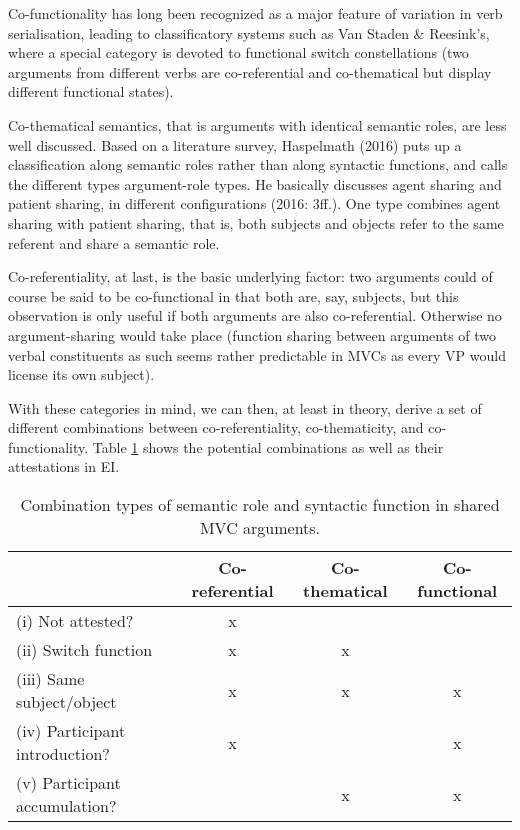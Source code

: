 Co-functionality has long been recognized as a major feature of variation in verb serialisation, leading to classificatory systems such as Van Staden \& Reesink's, where a special category is devoted to functional switch constellations (two arguments from different verbs are co-referential and co-thematical but display different functional states). 

Co-thematical semantics, that is arguments with identical semantic roles, are less well discussed. Based on a literature survey, Haspelmath (2016) puts up a classification along semantic roles rather than along syntactic functions, and calls the different types argument-role types. He basically discusses agent sharing and patient sharing, in different configurations (2016: 3ff.). One type combines agent sharing with patient sharing, that is, both subjects and objects refer to the same referent and share a semantic role.

Co-referentiality, at last, is the basic underlying factor: two arguments could of course be said to be co-functional in that both are, say, subjects, but this observation is only useful if both arguments are also co-referential. Otherwise no argument-sharing would take place (function sharing between arguments of two verbal constituents as such seems rather predictable in MVCs as every VP would license its own subject). 

With these categories in mind, we can then, at least in theory, derive a set of different combinations between co-referentiality, co-thematicity, and co-functionality. Table \ref{table:Combination_role-function} shows the potential combinations as well as their attestations in EI.

\begin{table}


\begin{tabular}{lccc}
  \hline\hline
  & {Co-referential} &{Co-thematical} & {Co-functional} \tabularnewline 
  \hline
(i) Not attested? & \cellcolor[gray]{.8} x & & \tabularnewline
(ii) Switch function & \cellcolor[gray]{.8} x & \cellcolor[gray]{.8} x & \tabularnewline
(iii) Same subject/object & \cellcolor[gray]{.8} x & \cellcolor[gray]{.8} x & \cellcolor[gray]{.8} x \tabularnewline
(iv) Participant introduction? & \cellcolor[gray]{.8} x & & \cellcolor[gray]{.8} x \tabularnewline
(v) Participant accumulation? & & \cellcolor[gray]{.8} x & \cellcolor[gray]{.8} x \tabularnewline
   \hline
\end{tabular}
\caption[Combination types of semantic role and syntactic function in shared MVC arguments]{Combination types of semantic role and syntactic function in shared MVC arguments.}
\label{table:Combination_role-function}


\end{table}


